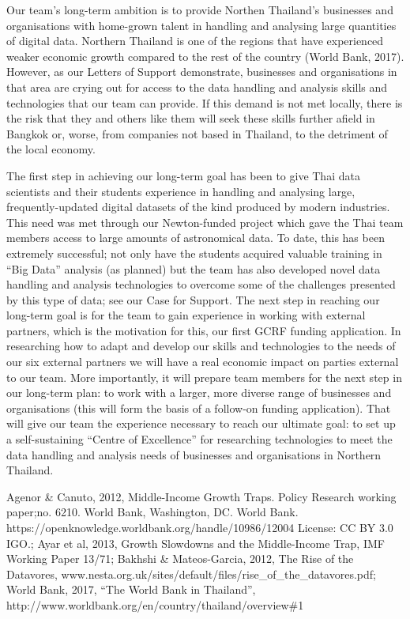 \documentclass[11pt]{article}
\begin{document}
\vspace{2mm}
\noindent
Our team's long-term ambition is to provide Northen Thailand's businesses and organisations with home-grown talent in handling and analysing large quantities of digital data. Northern Thailand is one of the regions that have experienced weaker economic growth compared to the rest of the country (World Bank, 2017). However, as our Letters of Support demonstrate, businesses and organisations in that area are crying out for access to the data handling and analysis skills and technologies that our team can provide. If this demand is not met locally, there is the risk that they and others like them will seek these skills further afield in Bangkok or, worse, from companies not based in Thailand, to the detriment of the local economy.

\vspace{2mm}
\noindent
The first step in achieving our long-term goal has been to give Thai data scientists and their students experience in handling and analysing large, frequently-updated digital datasets of the kind produced by modern industries. This need was met through our Newton-funded project which gave the Thai team members access to large amounts of astronomical data. To date, this has been extremely successful; not only have the students acquired valuable training in ``Big Data'' analysis (as planned) but the team has also developed novel data handling and analysis technologies to overcome some of the challenges presented by this type of data; see our Case for Support. The next step in reaching our long-term goal is for the team to gain experience in working with external partners, which is the motivation for this, our first GCRF funding application. In researching how to adapt and develop our skills and technologies to the needs of our six external partners we will have a real economic impact on parties external to our team. More importantly, it will prepare team members for the next step in our long-term plan: to work with a larger, more diverse range of businesses and organisations (this will form the basis of a follow-on funding application). That will give our team the experience necessary to reach our ultimate goal: to set up a self-sustaining ``Centre of Excellence'' for researching technologies to meet the data handling and analysis needs of businesses and organisations in Northern Thailand.

\vspace{2mm}
 {\scriptsize Agenor \& Canuto, 2012, Middle-Income Growth Traps. Policy Research working paper;no. 6210. World Bank, Washington, DC. World Bank. https://openknowledge.worldbank.org/handle/10986/12004 License: CC BY 3.0 IGO.; Ayar et al, 2013, Growth Slowdowns and the Middle-Income Trap, IMF Working Paper 13/71; Bakhshi \& Mateos-Garcia, 2012, The Rise of the Datavores, www.nesta.org.uk/sites/default/files/rise\_of\_the\_datavores.pdf; World Bank, 2017, ``The World Bank in Thailand'', http://www.worldbank.org/en/country/thailand/overview\#1}
\end{document}
